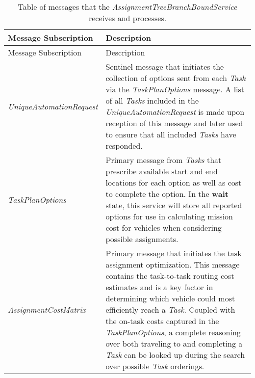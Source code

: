 \begin{longtable}[c]{@{}ll@{}}
\caption{Table of messages that the
\emph{AssignmentTreeBranchBoundService} receives and
processes.}\tabularnewline
\toprule
\begin{minipage}[b]{0.29\columnwidth}\raggedright\strut
Message Subscription
\strut\end{minipage} &
\begin{minipage}[b]{0.65\columnwidth}\raggedright\strut
Description
\strut\end{minipage}\tabularnewline
\midrule
\endfirsthead
\toprule
\begin{minipage}[b]{0.29\columnwidth}\raggedright\strut
Message Subscription
\strut\end{minipage} &
\begin{minipage}[b]{0.65\columnwidth}\raggedright\strut
Description
\strut\end{minipage}\tabularnewline
\midrule
\endhead
\begin{minipage}[t]{0.29\columnwidth}\raggedright\strut
\emph{UniqueAutomationRequest}
\strut\end{minipage} &
\begin{minipage}[t]{0.65\columnwidth}\raggedright\strut
Sentinel message that initiates the collection of options sent from each
\emph{Task} via the \emph{TaskPlanOptions} message. A list of all
\emph{Tasks} included in the \emph{UniqueAutomationRequest} is made upon
reception of this message and later used to ensure that all included
\emph{Tasks} have responded.
\strut\end{minipage}\tabularnewline
\begin{minipage}[t]{0.29\columnwidth}\raggedright\strut
\emph{TaskPlanOptions}
\strut\end{minipage} &
\begin{minipage}[t]{0.65\columnwidth}\raggedright\strut
Primary message from \emph{Tasks} that prescribe available start and end
locations for each option as well as cost to complete the option. In the
\textbf{wait} state, this service will store all reported options for
use in calculating mission cost for vehicles when considering possible
assignments.
\strut\end{minipage}\tabularnewline
\begin{minipage}[t]{0.29\columnwidth}\raggedright\strut
\emph{AssignmentCostMatrix}
\strut\end{minipage} &
\begin{minipage}[t]{0.65\columnwidth}\raggedright\strut
Primary message that initiates the task assignment optimization. This
message contains the task-to-task routing cost estimates and is a key
factor in determining which vehicle could most efficiently reach a
\emph{Task}. Coupled with the on-task costs captured in the
\emph{TaskPlanOptions}, a complete reasoning over both traveling to and
completing a \emph{Task} can be looked up during the search over
possible \emph{Task} orderings.
\strut\end{minipage}\tabularnewline
\bottomrule
\end{longtable}

